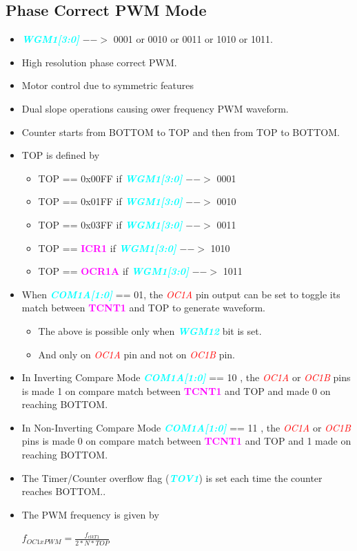 \documentclass{article}
\newcommand{\bitFormat}[1]{\emph{\textbf{\textcolor{cyan}{#1}}}}
\newcommand{\regFormat}[1]{\textbf{\textcolor{magenta}{#1}}}
\newcommand{\pinFormat}[1]{\emph{\textcolor{red}{#1}}}
\begin{document}
\subsection{Phase Correct PWM Mode}
\begin{itemize}
    \item \bitFormat{WGM1[3:0]} $-->$ 0001 or 0010 or 0011 or 1010 or 1011.    
    \item High resolution phase correct PWM.
    \item Motor control due to symmetric features
    \item Dual slope operations causing ower frequency PWM waveform.
    \item Counter starts from BOTTOM to TOP and then from TOP to BOTTOM.
    \item TOP is defined by
    \begin{itemize}
        \item TOP == 0x00FF if \bitFormat{WGM1[3:0]} $-->$ 0001
        \item TOP == 0x01FF if \bitFormat{WGM1[3:0]} $-->$ 0010
        \item TOP == 0x03FF if \bitFormat{WGM1[3:0]} $-->$ 0011
        \item TOP ==   \regFormat{ICR1} if \bitFormat{WGM1[3:0]} $-->$ 1010
        \item TOP ==  \regFormat{OCR1A} if \bitFormat{WGM1[3:0]} $-->$ 1011
    \end{itemize}
    \item  When \bitFormat{COM1A[1:0]} == 01, the \pinFormat{OC1A} pin output can be set to toggle its match between \regFormat{TCNT1} and TOP to generate waveform.
    \begin{itemize}
        \item The above is possible only when \bitFormat{WGM12} bit is set.
        \item And only on \pinFormat{OC1A} pin and not on \pinFormat{OC1B} pin.
    \end{itemize}
    \item In Inverting Compare Mode \bitFormat{COM1A[1:0]} == 10 , the \pinFormat{OC1A} or \pinFormat{OC1B} pins is made 1 on compare match between \regFormat{TCNT1} and TOP and made 0 on reaching BOTTOM.
    \item In Non-Inverting Compare Mode \bitFormat{COM1A[1:0]} == 11 , the \pinFormat{OC1A} or \pinFormat{OC1B} pins is made 0 on compare match between \regFormat{TCNT1} and TOP and 1 made  on reaching BOTTOM.
    \item The Timer/Counter overflow flag (\bitFormat{TOV1}) is set each time the counter reaches BOTTOM..
    \item The PWM frequency is given by 
    \begin{center}
        { \Large $f_{OC1xPWM} = \frac{f_{clkT1}}{2 * N * TOP}$ }
    \end{center}
\end{itemize}
\end{document}
